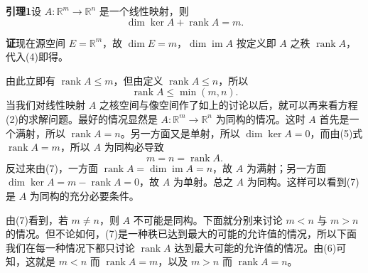 \noindent\textbf{引理1}\quad 设 $A:\mathbb R^m\to\mathbb R^n$ 是一个线性映射，则
\begin{equation}
 \dim\ker A+\operatorname{rank}A=m.
 \tag{5}
\end{equation}

\noindent\textbf{证}\quad 现在源空间 $E=\mathbb R^m$，故 $\dim E=m$，$\dim\operatorname{im}A$ 按定义即 $A$ 之秩 $\operatorname{rank}A$，代入(4)即得。

由此立即有 $\operatorname{rank}A\le m$，但由定义 $\operatorname{rank}A\le n$，所以
\begin{equation}
 \operatorname{rank}A\le\min(m,n).
 \tag{6}
\end{equation}
当我们对线性映射 $A$ 之核空间与像空间作了如上的讨论以后，就可以再来看方程(2)的求解问题。最好的情况显然是 $A:\mathbb R^m\to\mathbb R^n$ 为同构的情况。这时 $A$ 首先是一个满射，所以 $\operatorname{rank}A=n$。另一方面又是单射，所以 $\dim\ker A=0$，而由(5)式 $\operatorname{rank}A=m$，所以 $A$ 为同构必导致
\begin{equation}
 m=n=\operatorname{rank}A.
 \tag{7}
\end{equation}
反过来由(7)，一方面 $\operatorname{rank}A=\dim\operatorname{im}A=n$，故 $A$ 为满射；另一方面 $\dim\ker A=m-\operatorname{rank}A=0$，故 $A$ 为单射。总之 $A$ 为同构。这样可以看到(7)是 $A$ 为同构的充分必要条件。

由(7)看到，若 $m\ne n$，则 $A$ 不可能是同构。下面就分别来讨论 $m<n$ 与 $m>n$ 的情况。但不论如何，(7)是一种秩已达到最大的可能的允许值的情况，所以下面我们在每一种情况下都只讨论 $\operatorname{rank}A$ 达到最大可能的允许值的情况。由(6)可知，这就是 $m<n$ 而 $\operatorname{rank}A=m$，以及 $m>n$ 而 $\operatorname{rank}A=n$。

